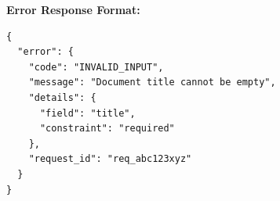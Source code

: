 \textbf{Error Response Format:}
\begin{lstlisting}[style=pythonstyle]
{
  "error": {
    "code": "INVALID_INPUT",
    "message": "Document title cannot be empty",
    "details": {
      "field": "title",
      "constraint": "required"
    },
    "request_id": "req_abc123xyz"
  }
}
\end{lstlisting}



